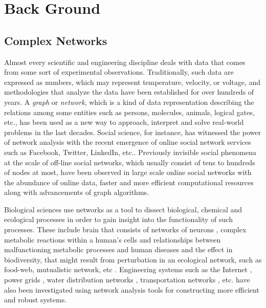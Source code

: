 \section{Back Ground}
	\subsection{Complex Networks}
	Almost every scientific and engineering discipline deals with data that comes from some sort of experimental observations. Traditionally, such data are expressed as numbers, which may represent temperature, velocity, or voltage, and methodologies that analyze the data have been established for over hundreds of years. A \textit{graph} or \textit{network}, which is a kind of data representation describing the relations among some entities such as persons, molecules, animals, logical gates, etc., has been used as a new way to approach, interpret and solve real-world problems in the last decades. Social science, for instance, has witnessed the power of network analysis with the recent emergence of online social network services such as Facebook, Twitter, LinkedIn, etc.\cite{Kleinberg:1}. Previously invisible social phenomena at the scale of off-line social networks, which usually consist of tens to hundreds of nodes at most, have been observed in large scale online social networks with the abundance of online data, faster and more efficient computational resources along with advancements of graph algorithms.
	
	
	Biological sciences use networks as a tool to dissect biological, chemical and ecological processes in order to gain insight into the functionality of such processes. These include brain that consists of networks of neurons \cite{BrainNetwork}, complex metabolic reactions within a human's cells and relationships between malfunctioning metabolic processes and human diseases \cite{MetabolicNetworkAndDiseases} and the effect in biodiversity, that might result from perturbation in an ecological network, such as food-web, mutualistic network, etc \cite{EcologicalNetwork}. Engineering systems such as the Internet \cite{Internet}, power grids \cite{PowerGrid}, water distribution networks \cite{WaterDistribution}, transportation networks \cite{Train}, etc. have also been investigated using network analysis tools for constructing more efficient and robust systems. 
	
